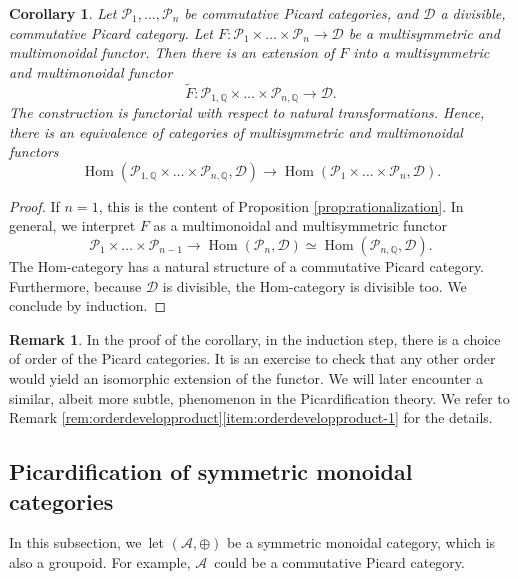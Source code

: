 \documentclass[11pt]{article}
\theoremstyle{plain}
\newtheorem{corollary}[theorem]{Corollary}
\theoremstyle{definition}
\newtheorem{remark}[theorem]{Remark}
\newcommand{\QBbb}{\mathbb Q}
\newcommand{\Acal}{\mathcal A}
\newcommand{\Dcal}{\mathcal D}
\newcommand{\Pcal}{\mathcal P}
\DeclareMathOperator{\Hom}{Hom}
\begin{document}
\begin{corollary}\label{cor:rationalization}
Let $\Pcal_{1},\ldots,\Pcal_{n}$ be commutative Picard categories, and $\Dcal$ a divisible, commutative Picard category. Let $F\colon \Pcal_{1}\times\ldots\times\Pcal_{n}\to\Dcal$ be a multisymmetric and multimonoidal functor. Then there is an extension of $F$ into a multisymmetric and multimonoidal functor
\begin{displaymath}
\widetilde{F}\colon \Pcal_{1,\QBbb}\times\ldots \times \Pcal_{n,\QBbb}\to \Dcal.
\end{displaymath}
The construction is functorial with respect to natural transformations. Hence, there is an equivalence of categories of multisymmetric and multimonoidal functors
\begin{displaymath}
\Hom(\Pcal_{1,\QBbb}\times\ldots\times\Pcal_{n,\QBbb},\Dcal)\to\Hom(\Pcal_{1}\times\ldots\times\Pcal_{n},\Dcal).
\end{displaymath}
\end{corollary}
\begin{proof}
If $n=1$, this is the content of Proposition \ref{prop:rationalization}. In general, we interpret $F$ as a multimonoidal and multisymmetric functor
\[
\Pcal_{1}\times\ldots\times\Pcal_{n-1}\to\Hom(\Pcal_{n},\Dcal)\simeq\Hom(\Pcal_{n,\QBbb},\Dcal).
\]
The Hom-category has a natural structure of a commutative Picard category. Furthermore, because $\Dcal$ is divisible, the Hom-category is divisible too. We conclude by induction.
\end{proof}
\begin{remark}\label{rmk:order-rationalization}
In the proof of the corollary, in the induction step, there is a choice of order of the Picard categories. It is an exercise to check that any other order would yield an isomorphic extension of the functor. We will later encounter a similar, albeit more subtle, phenomenon in the Picardification theory. We refer to Remark \ref{rem:orderdevelopproduct}\eqref{item:orderdevelopproduct-1} for the details.
\end{remark}

\subsection{Picardification of symmetric monoidal categories}\label{subsubsec:picardification}
In this subsection, we~let $(\Acal,\oplus)$ be a symmetric monoidal category, which is also a groupoid. For example, $\Acal$~could be a commutative Picard category.
\end{document}
